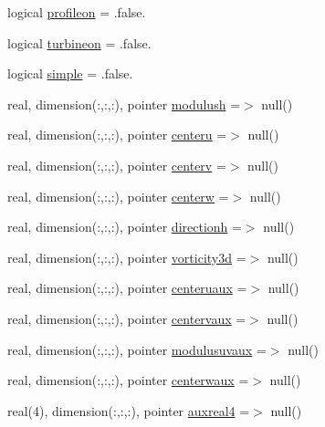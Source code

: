 \begin{DoxyCompactItemize}
logical \mbox{\hyperlink{structmodulehydrodynamic_1_1t__output_aed32e9cbccddb73469f3b3cac786527f}{profileon}} = .false.
\item 
logical \mbox{\hyperlink{structmodulehydrodynamic_1_1t__output_af514dc47501035b130c983af56e62cc9}{turbineon}} = .false.
\item 
logical \mbox{\hyperlink{structmodulehydrodynamic_1_1t__output_a2cbdf994b9c5dbcb8d7f67bf3f7e45ed}{simple}} = .false.
\item 
real, dimension(\+:,\+:,\+:), pointer \mbox{\hyperlink{structmodulehydrodynamic_1_1t__output_a2c56942fc5205c0b7bc28aa72c6f5dcb}{modulush}} =$>$ null()
\item 
real, dimension(\+:,\+:,\+:), pointer \mbox{\hyperlink{structmodulehydrodynamic_1_1t__output_a54726aa266303e8aae0aa80518c9d2b7}{centeru}} =$>$ null()
\item 
real, dimension(\+:,\+:,\+:), pointer \mbox{\hyperlink{structmodulehydrodynamic_1_1t__output_aaf0c97fc0418da08e74ba21be9879a15}{centerv}} =$>$ null()
\item 
real, dimension(\+:,\+:,\+:), pointer \mbox{\hyperlink{structmodulehydrodynamic_1_1t__output_af7bd53f1f5644431f50e39df46f73880}{centerw}} =$>$ null()
\item 
real, dimension(\+:,\+:,\+:), pointer \mbox{\hyperlink{structmodulehydrodynamic_1_1t__output_a5697c75b4a0d1ec558512a08f6b11987}{directionh}} =$>$ null()
\item 
real, dimension(\+:,\+:,\+:), pointer \mbox{\hyperlink{structmodulehydrodynamic_1_1t__output_a7904f478d014fcefe1c0a015c4544b02}{vorticity3d}} =$>$ null()
\item 
real, dimension(\+:,\+:,\+:), pointer \mbox{\hyperlink{structmodulehydrodynamic_1_1t__output_af67e3a154e2e82c1c40a32bc16a05279}{centeruaux}} =$>$ null()
\item 
real, dimension(\+:,\+:,\+:), pointer \mbox{\hyperlink{structmodulehydrodynamic_1_1t__output_a744e0bb3d5ff11e581f37b457aff4898}{centervaux}} =$>$ null()
\item 
real, dimension(\+:,\+:,\+:), pointer \mbox{\hyperlink{structmodulehydrodynamic_1_1t__output_a21efa671995fa8410542ddf2552c478e}{modulusuvaux}} =$>$ null()
\item 
real, dimension(\+:,\+:,\+:), pointer \mbox{\hyperlink{structmodulehydrodynamic_1_1t__output_a5fec0d9e8e4a3575ca336d373c3c99cf}{centerwaux}} =$>$ null()
\item 
real(4), dimension(\+:,\+:,\+:), pointer \mbox{\hyperlink{structmodulehydrodynamic_1_1t__output_abfb957750a43b1f2a57190b18451a290}{auxreal4}} =$>$ null()

\end{DoxyCompactItemize}
